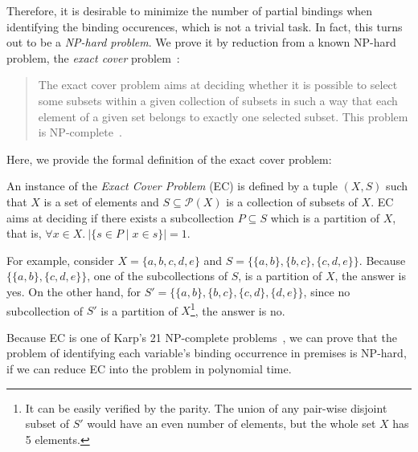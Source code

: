 Therefore, it is desirable to minimize the number of partial bindings when
identifying the binding occurences, which is not a trivial task.
In fact, this turns out to be a \textit{NP-hard problem}.
We prove it by reduction from a known NP-hard problem, the \textit{exact cover} problem~\cite{exactcover}:
\begin{quote}
The exact cover problem aims at deciding whether it is possible to select some subsets within a given collection of subsets in such a way that each element of a given set belongs to exactly one selected subset. This problem is NP-complete~\cite{karp72}.
\end{quote}
Here, we provide the formal definition of the exact cover problem:
\begin{definition}\label{def:exactcover}
An instance of the \textit{Exact Cover Problem} (EC) is defined by a tuple $(X, S)$
such that $X$ is a set of elements and $S \subseteq \mathcal{P}(X)$ is a collection of subsets of $X$.
EC aims at deciding if there exists a subcollection $P \subseteq S$ which is a partition of $X$,
that is, $\forall x \in X.\ |\{ s \in P \mid x \in s \}| = 1$.
\end{definition}

\noindent
For example, consider $X = \{a, b, c, d, e\}$ and $S = \{\{a,b\}, \{b,c\}, \{c,d,e\}\}$.
Because $\{\{a,b\}, \{c,d,e\}\}$, one of the subcollections of $S$, is a partition of $X$,
the answer is yes.
On the other hand, for $S' = \{\{a,b\}, \{b,c\}, \{c,d\}, \{d,e\}\}$,
since no subcollection of $S'$ is a partition of $X$\footnote{It can be easily
verified by the parity. The union of any pair-wise disjoint subset of $S'$ would have an even number
of elements, but the whole set $X$ has 5 elements.}, the answer is no.

Because EC is one of Karp's 21 NP-complete problems~\cite{karp72},
we can prove that the problem of identifying each variable's binding occurrence in premises is NP-hard,
if we can reduce EC into the problem in polynomial time.

